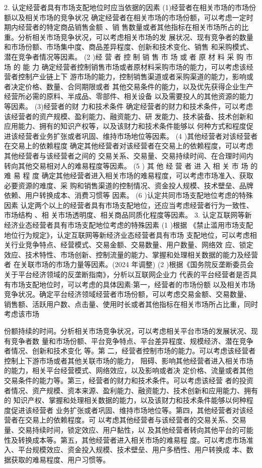\documentclass[UTF8,12pt]{ctexart}
\numberwithin{equation}{section} %
\numberwithin{figure}{section}
\numberwithin{table}{section}
\begin{document}
	2. 认定经营者具有市场支配地位时应当依据的因素 (1)经营者在相关市场的市场份额以及相关市场的竞争状况 确定经营者在相关市场的市场份额，可以考虑一定时期内经营者的特定商品销售金额 、销 售数量或者其他指标在相关市场所占的比重。分析相关市场竞争状况，可以考虑相关市场的发 展状况、现有竞争者的数量和市场份额、市场集中度、商品差异程度、创新和技术变化、销售 和采购模式、潜在竞争者情况等因素。
	(2 )经 营 者 控 制 销 售 市 场 或 者 原 材 料 采 购 市 场 的 能 力 确定经营者控制销售市场或者原材料采购市场的能力，可以考虑该经营者控制产业链上下 游市场的能力，控制销售渠道或者采购渠道的能力，影响或者决定价格、数量、合同期限或者 其他交易条件的能力，以及优先获得企业生产经营所必需的原料、半成品、零部件、相关设备 以及需要投人的其他资源的能力等因素。
	(3)经营者的财 力和技术条件 确定经营者的财力和技术条件，可以考虑该经营者的资产规模、盈利能力、融资能力、研 发能力、技术装备、技术创新和应用能力、拥有的知识产权等，以及该财力和技术条件能够以 何种方式和程度促进该经营者业务扩张或者巩固、维持市场地位等因素。
	(4 )其他经营者对该经营者在交易上的依赖程度 确定其他经营者对该经营者在交易上的依赖程度，可以考虑其他经营者与该经营者之间的 交易关系、交易量、交易持续时间、在合理时间内转向其他交易相对人的难易程度等因素。 (5 ) 其 他 经 营 者 进 入 相 关 市 场 的 难 易 程 度 确定其他经营者进入相关市场的难易程度，可以考虑市场准入、获取必要资源的难度、采 购和销售渠道的控制情况、资金投人规模、技术壁垒、品牌依赖、用户转换成本、消费习惯等 因素。
	(6 )认定共同市场支配地位考虑的特殊因素 认定两个以上的经营者具有市场支配地位，还应当考虑经营者行为一致性、市场结构 、相 关市场透明度、相关商品同质化程度等因素。
	3. 认定互联网等新经济业态经营者具有市场支配地位考虑的特殊因素
	(1 )根据 《禁止滥用市场支配地位行为规定》，认定互联网等新经济业态经营者具有市场 支配地位，可以考虑相关行业竞争特点、经营模式、交易金额、交易数量、用户数量、网络效 应、锁定效应、技术特性、市场创新、控制流量的能力、掌握和处理相关数据的能力及经营者 在关联市场的市场力量等因素。(2024 年调整)
	(2 )根据《国务院反垄断委员会关于平台经济领域的反垄断指南》，分析以互联网企业力 代表的平台经营者是否具有市场支配地位时，可以考虑的具体因素:第一，经营者的市场份额 以及相关市场竞争状况。确定平台经济领域经营者市场份额，可以考虑交易金额、交易数量、 销售额、活跃用户数、点击量、使用时长或者其他指标在相关市场所占比重，同时考虑该市场
	
	份额持续的时间。分析相关市场竞争状况，可以考虑相关平台市场的发展状况、现有竞争者数 量和市场份额、平台竞争特点、平台差异程度、规模经济、潜在竞争者情况、创新和技术变化 等。第 二，经营者控制市场的能力。可以考虑该经营者控制上下游市场或者其他关联市场的能力， 阻碍、影响其他经营者进入相关市场的能力，相关平台经营模式、网络效应，以及影响或者决 定价格、流量或者其他交易条件的能力等。第三，经营者的财力和技术条件。可以考虑该经营 者的投资者情况、资产规模、资本来源、盈利能力、融资能力、技术创新和应用能力、拥有的 知识产权、掌握和处理相关数据的能力，以及该财力和技术条件能够以何种程度促进该经营者 业务扩张或者巩固、维持市场地位等。第四，其他经营者对该经营者在交易上的依赖程度。可 以考虑其他经营者与该经营者的交易关系、交易量、交易持续时间，锁定效应、用户黏性，以 及其他经营者转向其他平台的可能性及转换成本等。第五，其他经营者进入相关市场的难易程 度。可以考虑市场准入、平台规模效应、资金投入规模、技术壁垒、用户多栖性、用户转换成 本、数据获取的难易程度、用户习惯等。
	
\end{document}
